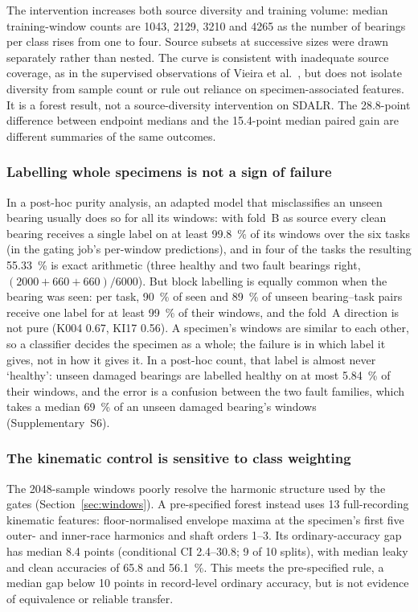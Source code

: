 The intervention increases both source diversity and training volume: median training-window counts are 1043, 2129, 3210 and 4265 as the number of bearings per class rises from one to four. Source subsets at successive sizes were drawn separately rather than nested. The curve is consistent with inadequate source coverage, as in the supervised observations of Vieira et al.\ \cite{vieira2026}, but does not isolate diversity from sample count or rule out reliance on specimen-associated features. It is a forest result, not a source-diversity intervention on SDALR. The 28.8-point difference between endpoint medians and the 15.4-point median paired gain are different summaries of the same outcomes.

\subsubsection{Labelling whole specimens is not a sign of failure}

In a post-hoc purity analysis, an adapted model that misclassifies an unseen bearing usually
does so for all its windows: with fold~B as source every clean bearing receives a single label on at least
\SI{99.8}{\percent} of its windows over the six tasks (in the gating job's per-window predictions), and in four of the tasks
the resulting \SI{55.33}{\percent} is exact arithmetic (three healthy and two fault bearings right,
$(2000 + 660 + 660)/6000$).
But block labelling is equally common when the bearing was seen: per task, \SI{90}{\percent} of seen and \SI{89}{\percent} of
unseen bearing--task pairs receive one label for at least \SI{99}{\percent} of their windows, and the fold~A direction is not
pure (K004 0.67, KI17 0.56). A specimen's windows are similar to each other, so a classifier decides the specimen as a whole;
the failure is in which label it gives, not in how it gives it. In a post-hoc count, that label is almost never `healthy': unseen damaged
bearings are labelled healthy on at most \SI{5.84}{\percent} of their windows, and the error is a confusion between the two
fault families, which takes a median \SI{69}{\percent} of an unseen damaged bearing's windows (Supplementary~S6).

\subsubsection{The kinematic control is sensitive to class weighting}

The 2048-sample windows poorly resolve the harmonic structure used by the gates (Section~\ref{sec:windows}). A pre-specified forest instead uses 13 full-recording kinematic features: floor-normalised envelope maxima at the specimen's first five outer- and inner-race harmonics and shaft orders 1--3. Its ordinary-accuracy gap has median 8.4 points (conditional CI 2.4--30.8; 9 of 10 splits), with median leaky and clean accuracies of \SI{65.8}{} and \SI{56.1}{\percent}. This meets the pre-specified rule, a median gap below 10 points in record-level ordinary accuracy, but is not evidence of equivalence or reliable transfer.

